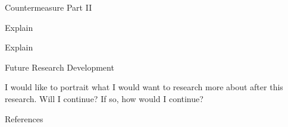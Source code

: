 \documentclass[final]{beamer}
\newlength{\sepwidth}
\newlength{\colwidth}
\newcommand{\separatorcolumn}{\begin{column}{\sepwidth}\end{column}}
\begin{document}
\begin{frame}[t]
\begin{columns}[t]
\begin{column}{\colwidth}
\begin{block}{Countermeasure Part II}
 


    Explain


    Explain
  \end{block}

  \begin{block}{Future Research Development}

    I would like to portrait what I would want to research more about after this research. Will I continue? If so, how would I continue? 



    

  \end{block}

  \begin{block}{References}

    \nocite{*}
    \footnotesize{}

  \end{block}

\end{column}

\separatorcolumn
\end{columns}
\end{frame}
\end{document}
